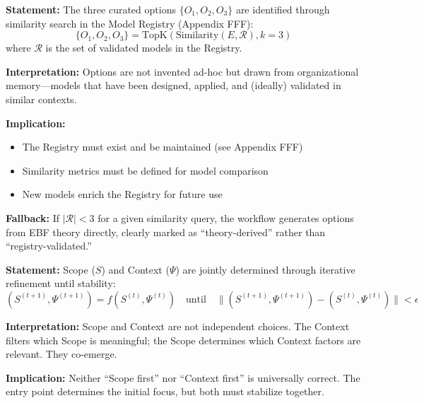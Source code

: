 \begin{tcolorbox}[colback=gray!5!white, colframe=gray!75!black,
    title=Axiom MD-2: Registry-Based Option Selection]
\textbf{Statement:} The three curated options $\{O_1, O_2, O_3\}$ are identified
through similarity search in the Model Registry (Appendix FFF):
\begin{equation}
\{O_1, O_2, O_3\} = \text{TopK}\left(\text{Similarity}(E, \mathcal{R}), k=3\right)
\end{equation}
where $\mathcal{R}$ is the set of validated models in the Registry.

\textbf{Interpretation:} Options are not invented ad-hoc but drawn from
organizational memory---models that have been designed, applied, and
(ideally) validated in similar contexts.

\textbf{Implication:}
\begin{itemize}[nosep]
\item The Registry must exist and be maintained (see Appendix FFF)
\item Similarity metrics must be defined for model comparison
\item New models enrich the Registry for future use
\end{itemize}

\textbf{Fallback:} If $|\mathcal{R}| < 3$ for a given similarity query,
the workflow generates options from EBF theory directly, clearly marked
as ``theory-derived'' rather than ``registry-validated.''
\end{tcolorbox}

\begin{tcolorbox}[colback=gray!5!white, colframe=gray!75!black,
    title=Axiom MD-3: Scope-Context Iteration]
\textbf{Statement:} Scope ($S$) and Context ($\Psi$) are jointly determined
through iterative refinement until stability:
\begin{equation}
(S^{(t+1)}, \Psi^{(t+1)}) = f(S^{(t)}, \Psi^{(t)}) \quad \text{until} \quad
\|(S^{(t+1)}, \Psi^{(t+1)}) - (S^{(t)}, \Psi^{(t)})\| < \epsilon
\end{equation}

\textbf{Interpretation:} Scope and Context are not independent choices.
The Context filters which Scope is meaningful; the Scope determines which
Context factors are relevant. They co-emerge.

\textbf{Implication:} Neither ``Scope first'' nor ``Context first'' is
universally correct. The entry point determines the initial focus, but
both must stabilize together.
\end{tcolorbox}

